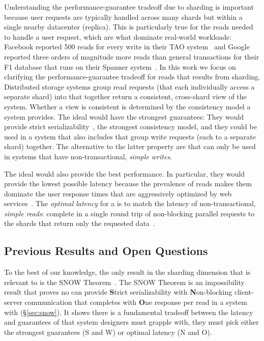 Understanding the performance-guarantee tradeoff due to sharding is important because user requests are typically handled across many shards but within a single nearby datacenter (replica).
This is particularly true for the reads needed to handle a user request, which are what dominate real-world workloads:
Facebook reported 500 reads for every write in their TAO system~\cite{TAO2013} and
Google reported three orders of magnitude more reads than general transactions for their F1 database that runs on their Spanner system~\cite{Corbett:osdi2012}.
In this work we focus on clarifying the performance-guarantee tradeoff for reads that results from sharding.
Distributed storage systems group read requests (that each individually access a separate shard) into \textit{\rots{}} that together return a consistent, cross-shard view of the system.
Whether a view is consistent is determined by the consistency model a system provides.
The ideal \rots{} would have the strongest guarantees:
They would provide strict serializability~\cite{Papadimitriou79}, the strongest consistency model,
and they could be used in a system that also includes \textit{\wots{}} that group write requests (each to a separate shard) together.
The alternative to the latter property are \rots{} that can only be used in systems that have non-transactional, \textit{simple writes}.

The ideal \rots{} would also provide the best performance.
In particular, they would provide the lowest possible latency because the prevalence of reads makes them dominate the user response times that are aggressively optimized by web services~\cite{latency:shopzilla, latency:amazon,
  latency:search}.
The \textit{optimal latency} for a \rot{} is to match the latency of non-transactional, \textit{simple reads}:
complete in a single round trip of non-blocking parallel requests to the shards that return only the requested data~\cite{SNOW2016}.


\subsection{Previous Results and Open Questions}
To the best of our knowledge, the only result in the sharding dimension that is relevant to \rots{} is the SNOW Theorem~\cite{SNOW2016}.
The SNOW Theorem is an impossibility result that proves no \rot{} can provide \textbf{S}trict serializability with \textbf{N}on-blocking client-server communication that completes with \textbf{O}ne response per read in a system with \wotsSNOW{} (\S\ref{sec:snow}).
It shows there is a fundamental tradeoff between the latency and guarantees of \rots{} that system designers must grapple with, they must pick either the strongest guarantees (S and W) or optimal latency (N and O).

